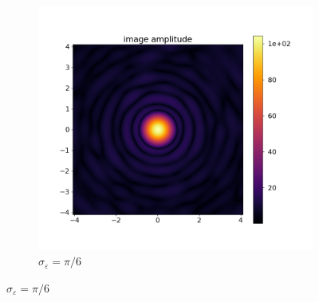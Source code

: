 \documentclass[11pt]{article}
\newcommand{\eps}{\varepsilon}
\begin{document}
\begin{figure}
\begin{subfigure}{\textwidth}
\begin{minipage}{0.5\textwidth}
            \includegraphics[width=\textwidth]{pictures/error_pics/errors0out_abs.png}
        \end{minipage}
        \caption{$\sigma_{\eps} = \pi/6$}\label{fig:randpic:1}
    \end{subfigure}


\end{figure}
\end{document}
